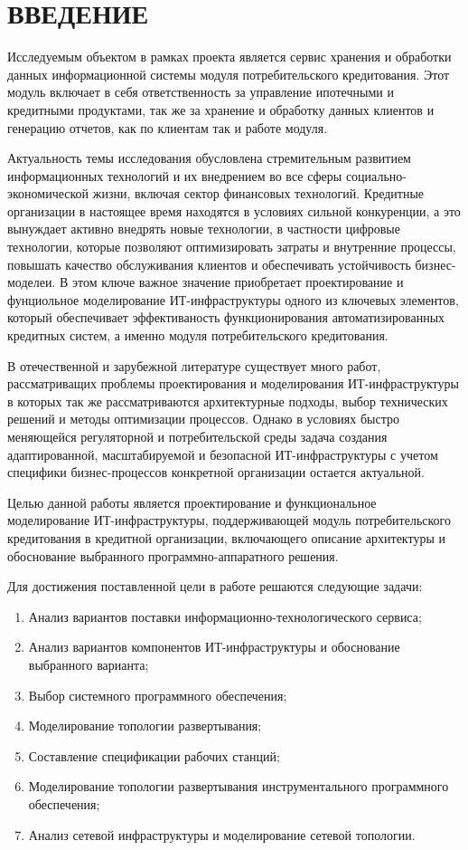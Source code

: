 \documentclass[14pt, a4paper]{extarticle}
\begin{document}
\section*{ВВЕДЕНИЕ}
{}

Исследуемым объектом в рамках проекта является сервис хранения и обработки
данных информационной системы модуля потребительского кредитования. Этот модуль включает в
себя ответственность за управление ипотечными и кредитными продуктами, так же
за хранение и обработку данных клиентов и генерацию отчетов, как по клиентам
так и работе модуля.

Актуальность темы исследования обусловлена стремительным развитием информационных
технологий и их внедрением во все сферы социально-экономической жизни, включая сектор
финансовых технологий. Кредитные организации в настоящее время находятся в условиях
сильной конкуренции, а это вынуждает активно внедрять новые технологии, в частности
цифровые технологии, которые позволяют оптимизировать затраты и внутренние процессы,
повышать качество обслуживания клиентов и обеспечивать устойчивость бизнес-моделеи.
В этом ключе важное значение приобретает проектирование и фунциольное моделирование
ИТ-инфраструктуры одного из ключевых элементов, который обеспечивает эффективаность
функционирования автоматизированных кредитных систем, а именно модуля потребительского
кредитования.

В отечественной и зарубежной литературе существует много работ, рассматриващих
проблемы проектирования и моделирования ИТ-инфраструктуры в которых так же
рассматриваются архитектурные подходы, выбор технических решений и методы оптимизации
процессов. Однако в условиях быстро меняющейся регуляторной и потребительской среды
задача создания адаптированной, масштабируемой и безопасной ИТ-инфраструктуры с учетом
специфики бизнес-процессов конкретной организации остается актуальной.

Целью данной работы является проектирование и функциональное моделирование
ИТ-инфраструктуры, поддерживающей модуль потребительского кредитования в
кредитной организации, включающего описание архитектуры и обоснование выбранного
программно-аппаратного решения.

Для достижения поставленной цели в работе решаются следующие задачи:

\begin{enumerate}
  \item Анализ вариантов поставки информационно-технологического сервиса;
  \item Анализ вариантов компонентов ИТ-инфраструктуры и обоснование выбранного варианта;
  \item Выбор системного программного обеспечения;
  \item Моделирование топологии развертывания;
  \item Составление спецификации рабочих станций;
  \item Моделирование топологии развертывания инструментального программного обеспечения;
  \item Анализ сетевой инфраструктуры и моделирование сетевой топологии.
\end{enumerate}
\end{document}
